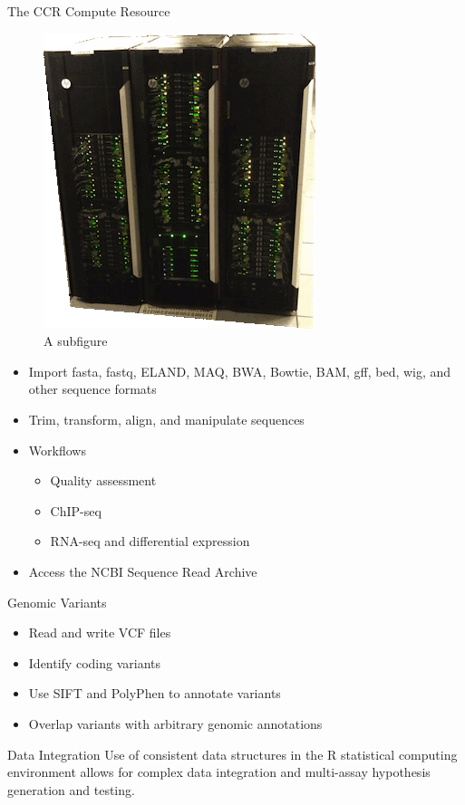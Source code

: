 \documentclass[final]{beamer}
\begin{document}
\begin{frame}[t]
\begin{columns}[t]
    \begin{column}{0.3\linewidth}
      \begin{block}{The CCR Compute Resource}
        \begin{figure}
          \begin{center}
            \includegraphics[width=0.4\linewidth]{20130102-LCP-nodes}
          \end{center}
          \caption{A subfigure}
          \label{fig:biowulf}
        \end{figure}
        \begin{itemize}
          \item{Import fasta, fastq, ELAND, MAQ, BWA, Bowtie, BAM, gff, bed, wig, and other sequence formats} 
          \item{Trim, transform, align, and manipulate sequences}
          \item{Workflows}
            \begin{itemize}
              \item{Quality assessment}
              \item{ChIP-seq}
              \item{RNA-seq and differential expression}
            \end{itemize}
          \item{Access the NCBI Sequence Read Archive}
        \end{itemize}
      \end{block}
      \begin{block}{Genomic Variants}
        \begin{itemize}
          \item{Read and write VCF files}
          \item{Identify coding variants}
          \item{Use SIFT and PolyPhen to annotate variants}
          \item{Overlap variants with arbitrary genomic annotations}
        \end{itemize}
      \end{block}
      \begin{block}{Data Integration}
        Use of consistent data structures in the R statistical computing environment allows for complex data integration and multi-assay hypothesis generation and testing.
      \end{block}
    \end{column}
    \end{columns}
  \end{frame}
\end{document}
